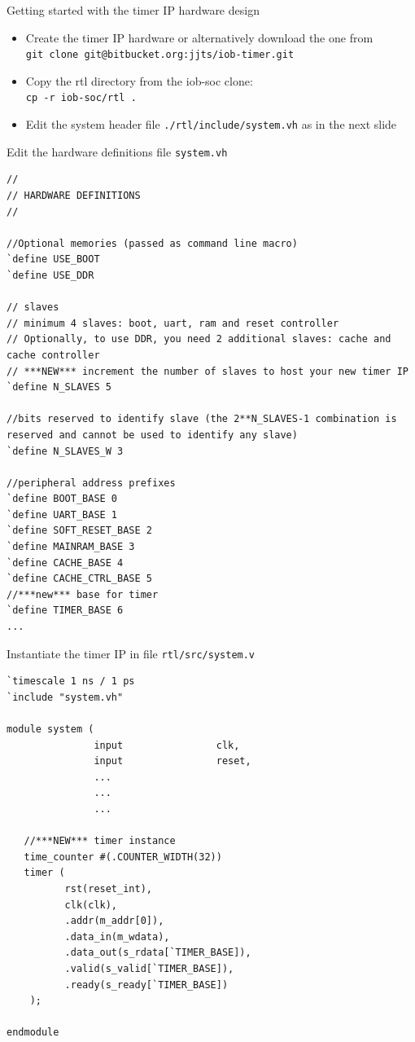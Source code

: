 \documentclass [xcolor=svgnames, t] {beamer}
\begin{document}
\begin{frame}{Getting started with the timer IP hardware design}
\begin{itemize}
\item Create the timer IP hardware or alternatively download the one from
  \\{\tt git clone git@bitbucket.org:jjts/iob-timer.git}
\item Copy the rtl directory from the iob-soc clone:
  \\{\tt cp -r iob-soc/rtl .}
\item Edit the system header file {\tt ./rtl/include/system.vh} as in the next slide\\
\end{itemize}
\end{frame}

\begin{frame}[fragile]{Edit the hardware definitions file {\tt system.vh}}
\begin{tiny}
\begin{lstlisting}
//
// HARDWARE DEFINITIONS
//

//Optional memories (passed as command line macro)
`define USE_BOOT
`define USE_DDR

// slaves
// minimum 4 slaves: boot, uart, ram and reset controller
// Optionally, to use DDR, you need 2 additional slaves: cache and cache controller
// ***NEW*** increment the number of slaves to host your new timer IP
`define N_SLAVES 5

//bits reserved to identify slave (the 2**N_SLAVES-1 combination is reserved and cannot be used to identify any slave)
`define N_SLAVES_W 3

//peripheral address prefixes
`define BOOT_BASE 0
`define UART_BASE 1
`define SOFT_RESET_BASE 2
`define MAINRAM_BASE 3
`define CACHE_BASE 4
`define CACHE_CTRL_BASE 5
//***new*** base for timer
`define TIMER_BASE 6
...
\end{lstlisting}
\end{tiny}
\end{frame}

\begin{frame}[fragile]{Instantiate the timer IP in file {\tt rtl/src/system.v}}
\begin{tiny}
\begin{lstlisting}
`timescale 1 ns / 1 ps
`include "system.vh"

module system (
               input                clk,
               input                reset,
               ...
               ...
               ...

   //***NEW*** timer instance
   time_counter #(.COUNTER_WIDTH(32))
   timer (
          rst(reset_int),
          clk(clk),
          .addr(m_addr[0]),
          .data_in(m_wdata),
          .data_out(s_rdata[`TIMER_BASE]),
          .valid(s_valid[`TIMER_BASE]),
          .ready(s_ready[`TIMER_BASE])
    );

endmodule

\end{lstlisting}
\end{tiny}
\end{frame}
\end{document}
